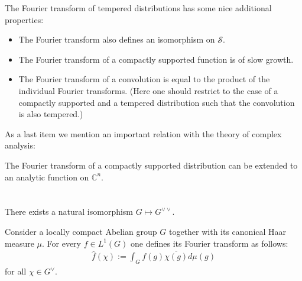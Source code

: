     \begin{property}
        The Fourier transform of tempered distributions has some nice additional properties:
        \begin{itemize}
            \item The Fourier transform also defines an isomorphism on $\mathscr{S}$.
            \item The Fourier transform of a compactly supported function is of slow growth.
            \item The Fourier transform of a convolution is equal to the product of the individual Fourier transforms. (Here one should restrict to the case of a compactly supported and a tempered distribution such that the convolution is also tempered.)
        \end{itemize}
    \end{property}
    As a last item we mention an important relation with the theory of complex analysis:
    \begin{theorem}
        The Fourier transform of a compactly supported distribution can be extended to an analytic function on $\mathbb{C}^n$.
    \end{theorem}

\section{}

    \begin{theorem}
        There exists a natural isomorphism $G\mapsto G^{\vee\vee}$.
    \end{theorem}

    \begin{construct}
        Consider a locally compact Abelian group $G$ together with its canonical Haar measure $\mu$. For every $f\in L^1(G)$ one defines its Fourier transform as follows:
        \begin{gather}
            \widehat{f}(\chi) := \int_G f(g)\overline{\chi(g)}d\mu(g)
        \end{gather}
        for all $\chi\in G^\vee$.
    \end{construct}

